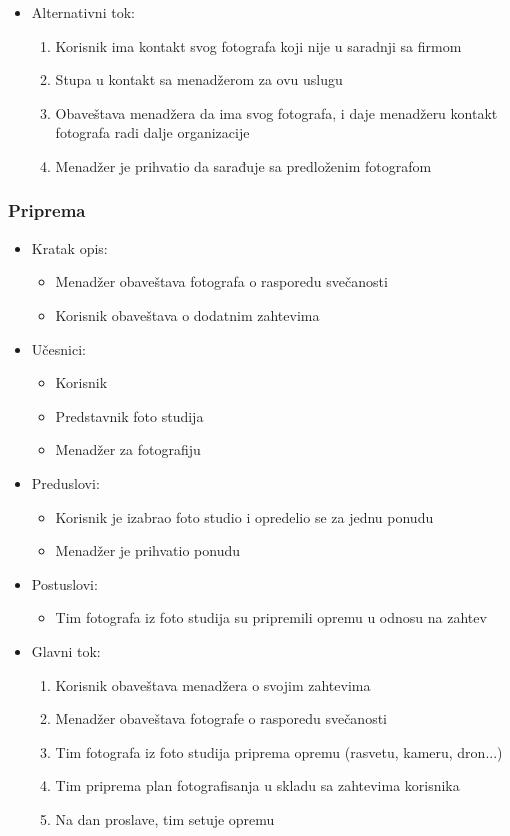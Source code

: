 \documentclass[a4paper]{article}
\begin{document}
\begin{itemize}
    \item Alternativni tok:
        \begin{enumerate}
            \item Korisnik ima kontakt svog fotografa koji nije u saradnji sa firmom
            \item Stupa u kontakt sa menadžerom za ovu uslugu
            \item Obaveštava menadžera da ima svog fotografa, i daje menadžeru kontakt fotografa radi dalje organizacije
            \item Menadžer je prihvatio da sarađuje sa predloženim fotografom
        \end{enumerate}
\end{itemize}

\subsubsection{Priprema}
\begin{itemize}
    \item Kratak opis: 
    \begin{itemize}
        \item Menadžer obaveštava fotografa o rasporedu svečanosti
        \item Korisnik obaveštava o dodatnim zahtevima
    \end{itemize}
    \item Učesnici:
        \begin{itemize}
        \item Korisnik
        \item Predstavnik foto studija
        \item Menadžer za fotografiju
    \end{itemize}
    \item Preduslovi:
        \begin{itemize}
            \item Korisnik je izabrao foto studio i opredelio se za jednu ponudu
            \item Menadžer je prihvatio ponudu
        \end{itemize}
    \item Postuslovi:
        \begin{itemize}
            \item Tim fotografa iz foto studija su pripremili opremu u odnosu na zahtev
        \end{itemize}
    \item Glavni tok:
        \begin{enumerate}
            \item Korisnik obaveštava menadžera o svojim zahtevima 
            \item Menadžer obaveštava fotografe o rasporedu svečanosti
            \item Tim fotografa iz foto studija priprema opremu (rasvetu, kameru, dron...)
            \item Tim priprema plan fotografisanja u skladu sa zahtevima korisnika
            \item Na dan proslave, tim setuje opremu
        \end{enumerate}
\end{itemize}
\end{document}
